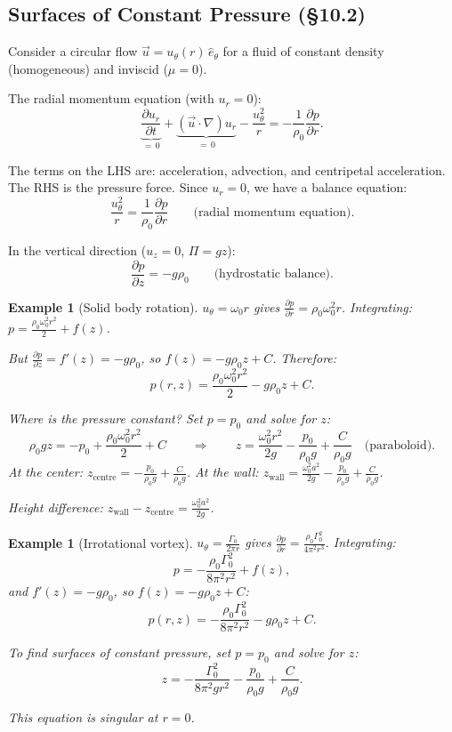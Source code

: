 \documentclass[11pt,a4paper]{article}
\newtheorem{example}[theorem]{Example}
\newcommand{\pdt}[1]{\frac{\partial #1}{\partial t}}
\newcommand{\pdx}[2]{\frac{\partial #1}{\partial #2}}
\newcommand{\uv}{\vec{u}}
\begin{document}
\subsection{Surfaces of Constant Pressure (\S10.2)}

Consider a circular flow $\uv = u_\theta(r)\,\hat{e}_\theta$ for a fluid of constant density (homogeneous) and inviscid ($\mu = 0$).

The radial momentum equation (with $u_r = 0$):
\[
    \underbrace{\pdt{u_r}}_{=\,0} + \underbrace{(\uv\cdot\nabla)u_r}_{=\,0} - \frac{u_\theta^2}{r} = -\frac{1}{\rho_0}\pdx{p}{r}.
\]

The terms on the LHS are: acceleration, advection, and centripetal acceleration. The RHS is the pressure force. Since $u_r = 0$, we have a balance equation:
\[
    \boxed{\frac{u_\theta^2}{r} = \frac{1}{\rho_0}\pdx{p}{r}}  \qquad \text{(radial momentum equation)}.
\]

In the vertical direction ($u_z = 0$, $\Pi = gz$):
\[
    \pdx{p}{z} = -g\rho_0 \qquad \text{(hydrostatic balance)}.
\]

\begin{example}[Solid body rotation]
$u_\theta = \omega_0 r$ gives $\pdx{p}{r} = \rho_0\omega_0^2 r$. Integrating: $p = \frac{\rho_0\omega_0^2 r^2}{2} + f(z)$.

But $\pdx{p}{z} = f'(z) = -g\rho_0$, so $f(z) = -g\rho_0 z + C$. Therefore:
\[
    \boxed{p(r,z) = \frac{\rho_0\omega_0^2 r^2}{2} - g\rho_0 z + C.}
\]

Where is the pressure constant? Set $p = p_0$ and solve for $z$:
\[
    \rho_0 g z = -p_0 + \frac{\rho_0\omega_0^2 r^2}{2} + C
    \qquad \Longrightarrow \qquad
    z = \frac{\omega_0^2 r^2}{2g} - \frac{p_0}{\rho_0 g} + \frac{C}{\rho_0 g} \quad \text{(paraboloid)}.
\]
At the center: $z_{\text{centre}} = -\frac{p_0}{\rho_0 g} + \frac{C}{\rho_0 g}$. At the wall: $z_{\text{wall}} = \frac{\omega_0^2 a^2}{2g} - \frac{p_0}{\rho_0 g} + \frac{C}{\rho_0 g}$.

Height difference: $z_{\text{wall}} - z_{\text{centre}} = \frac{\omega_0^2 a^2}{2g}$.
\end{example}

\begin{example}[Irrotational vortex]
$u_\theta = \frac{\Gamma_0}{2\pi r}$ gives $\pdx{p}{r} = \frac{\rho_0\Gamma_0^2}{4\pi^2 r^3}$. Integrating:
\[
    p = -\frac{\rho_0\Gamma_0^2}{8\pi^2 r^2} + f(z),
\]
and $f'(z) = -g\rho_0$, so $f(z) = -g\rho_0 z + C$:
\[
    \boxed{p(r,z) = -\frac{\rho_0\Gamma_0^2}{8\pi^2 r^2} - g\rho_0 z + C.}
\]

To find surfaces of constant pressure, set $p = p_0$ and solve for $z$:
\[
    z = -\frac{\Gamma_0^2}{8\pi^2 g r^2} - \frac{p_0}{\rho_0 g} + \frac{C}{\rho_0 g}.
\]

This equation is singular at $r = 0$.
\end{example}
\end{document}

